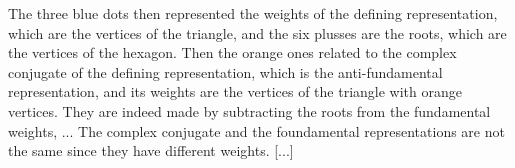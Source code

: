 \begin{example}[\(\mathfrak{g} = \mathfrak{su}(3)_\mathbb{C} = \mathfrak{sl}(3, \mathbb{C})\)]
        [...]

    The three blue dots then represented the weights of the defining representation, which are the vertices of the triangle, and the six plusses are the roots, which are the vertices of the hexagon. Then the orange ones related to the complex conjugate of the defining representation, which is the anti-fundamental representation, and its weights are the vertices of the triangle with orange vertices. They are indeed made by subtracting the roots from the fundamental weights, ...
    The complex conjugate and the foundamental representations are not the same since they have different weights.
        [...]

\end{example}

